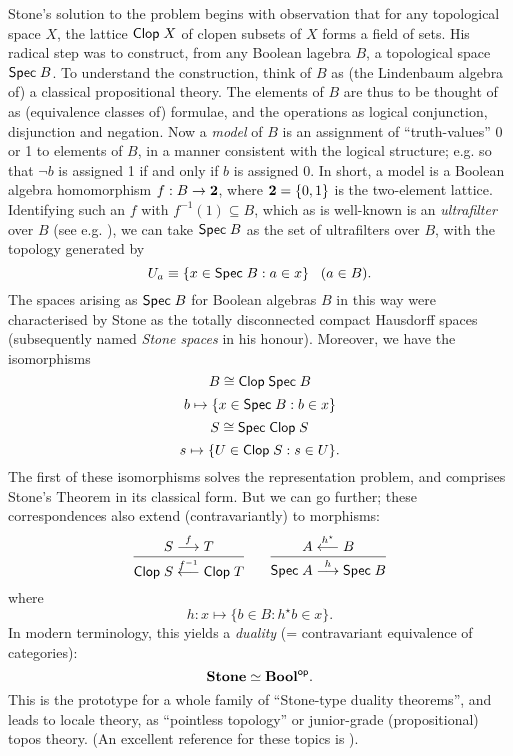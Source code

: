 Stone's solution to the problem begins with observation that for any topological space $X$, the lattice ${\sf Clop} \; X$ of clopen subsets of $X$ forms a field of sets.
His radical step was to construct, from any Boolean lagebra $B$, a topological space ${\sf Spec} \; B$.
To understand the construction, think of $B$ as (the Lindenbaum algebra of) a classical propositional theory.
The elements of $B$ are thus to be thought of as (equivalence classes of) formulae, and the operations as logical conjunction, disjunction and negation.
Now a {\em model} of $B$ is an assignment of ``truth-values'' 0 or 1 to elements of $B$, in a manner consistent with the logical structure; e.g. so that $\neg b$ is assigned 1 if and only if $b$ is assigned 0.
In short, a model is a Boolean algebra homomorphism $f : B \rightarrow {\bf 2}$, where ${\bf 2} = \{ 0, 1 \}$ is the two-element lattice.
Identifying such an $f$ with $f^{-1}(1) \subseteq B$, which as is well-known is an {\em ultrafilter} over $B$ (see e.g. \cite{Joh82}), we can take ${\sf Spec} \; B$ as the set of ultrafilters over $B$, with the topology generated by
\[ U_{a} \equiv \{ x \in {\sf Spec} \; B : a \in x \} \;\;\; ( a \in B) . \]
The spaces arising as ${\sf Spec} \; B$ for Boolean algebras $B$ in this way were characterised by Stone as the totally disconnected compact Hausdorff spaces (subsequently named {\it Stone spaces} in his honour).
Moreover, we have the isomorphisms
\begin{equation}
B \cong {\sf Clop} \; {\sf Spec} \; B 
\end{equation}
\[ b \mapsto \{ x \in {\sf Spec} \; B : b \in x \} \]
\begin{equation}
S \cong {\sf Spec} \; {\sf Clop} \; S
\end{equation}
\[ s \mapsto \{ U \in {\sf Clop} \; S : s \in U \} . \]
The first of these isomorphisms solves the representation problem, and comprises Stone's Theorem in its classical form.
But we can go further; these correspondences also extend (contravariantly) to morphisms:
\[ \frac{S \stackrel{f}{\longrightarrow} T}{{\sf Clop} \; S 
\stackrel{f^{-1}}{\longleftarrow} {\sf Clop} \; T} \;\;\;\;\;\;
\frac{A \stackrel{h^{\star}}{\longleftarrow} B}{{\sf Spec} \; A \stackrel{h}{\longrightarrow} {\sf Spec} \; B} \]
where
\[ h : x \mapsto \{ b \in B : h^{\star} b \in x \} . \]
In modern terminology, this yields a {\em duality} (= contravariant equivalence of categories):
\[ {\bf Stone} \simeq {\bf Bool}^{\sf op} . \]
This is the prototype for a whole family of ``Stone-type duality theorems'', and leads to locale theory, as ``pointless topology'' or junior-grade (propositional) topos theory.
(An excellent reference for these topics is \cite{Joh82}).

